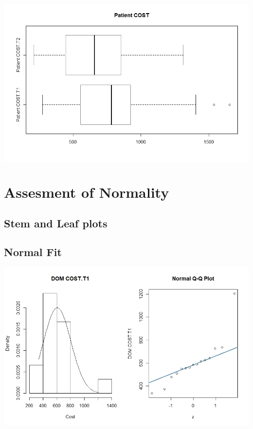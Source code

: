 \documentclass[]{article}
\begin{document}
\centering
\includegraphics[width=\textwidth]{RStudio/jpeg/Box_COST.jpeg}
\raggedright

\section{Assesment of Normality}
\subsection{Stem and Leaf plots}



\subsection{Normal Fit}


\centering
\includegraphics[width=\textwidth]{RStudio/jpeg/Norm_DOM_T1.jpeg}
\raggedright
\end{document}
